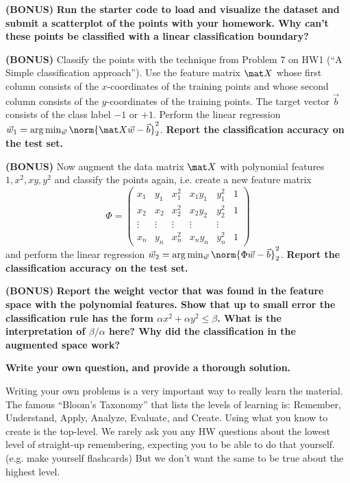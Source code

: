 \documentclass[preview]{standalone}
\begin{document}
\begin{Parts}
\Part \textbf{(BONUS)} \textbf{Run the starter code to load and visualize the dataset and submit a scatterplot of the points with your homework.
Why can't these points be classified with a linear classification boundary?}



\Part  \textbf{(BONUS)} Classify the points with the technique from Problem 7 on HW1 (``A Simple classification approach'').
Use the feature matrix $\mat X$ whose first column consists of the $x$-coordinates of the training points and whose second column
consists of the $y$-coordinates of the training points. The target vector $\vec b$ consists of the class label $-1$ or $+1$.
Perform the linear regression $\vec w_1 = \arg\min_{\vec w} \norm{\mat X\vec w - \vec b}_2^2$.
\textbf{Report the classification accuracy on the test set.}



\Part  \textbf{(BONUS)} Now augment the data matrix $\mat X$ with polynomial features $1, x^2, xy, y^2$ and classify the points again, i.e. create a new
feature matrix
$$\Phi = \begin{pmatrix}x_1 & y_1 & x_1^2 & x_1 y_1 & y_1^2 & 1\\
x_2 & x_2 & x_2^2 & x_2 y_2 & y_2^2 & 1\\ \vdots & \vdots & \vdots & \vdots & \vdots \\ x_n & y_n & x_n^2 & x_n y_n & y_n^2 & 1\end{pmatrix}$$
and perform the linear regression $\vec w_2 = \arg\min_{\vec w} \norm{\Phi\vec w - \vec b}_2^2$.
\textbf{Report the classification accuracy on the test set.}


\Part  \textbf{(BONUS)} \textbf{Report the weight vector that was found in the feature space with the polynomial features.
 Show that up to small error the classification rule has the form $\alpha x^2 + \alpha y^2 \leq \beta$.
 What is the interpretation of $\beta/\alpha$ here? Why did the classification in the augmented space work?}



\end{Parts}


{\bf Write your own question, and provide a thorough solution.}

Writing your own problems is a very important way to really learn
the material. The famous ``Bloom's Taxonomy'' that lists the levels of
learning is: Remember, Understand, Apply, Analyze, Evaluate, and
Create. Using what you know to create is the top-level. We rarely ask
you any HW questions about the lowest level of straight-up
remembering, expecting you to be able to do that yourself. (e.g. make
yourself flashcards) But we don't want the same to be true about the
highest level.
\end{document}
